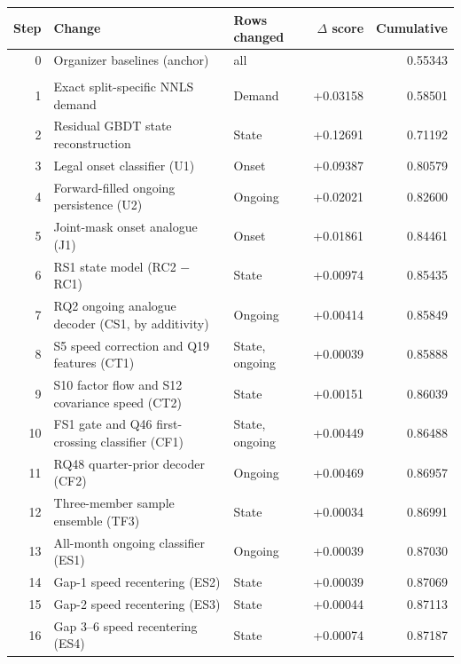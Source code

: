 \begin{tabular}{@{}r l l r r@{}}
\toprule
Step & Change & Rows changed & $\Delta$ score & Cumulative \\
\midrule
0 & Organizer baselines (anchor) & all & & 0.55343 \\\\
1 & Exact split-specific NNLS demand & Demand & +0.03158 & 0.58501 \\
2 & Residual GBDT state reconstruction & State & +0.12691 & 0.71192 \\
3 & Legal onset classifier (U1) & Onset & +0.09387 & 0.80579 \\
4 & Forward-filled ongoing persistence (U2) & Ongoing & +0.02021 & 0.82600 \\
5 & Joint-mask onset analogue (J1) & Onset & +0.01861 & 0.84461 \\
6 & RS1 state model (RC2 $-$ RC1) & State & +0.00974 & 0.85435 \\
7 & RQ2 ongoing analogue decoder (CS1, by additivity) & Ongoing & +0.00414 & 0.85849 \\
8 & S5 speed correction and Q19 features (CT1) & State, ongoing & +0.00039 & 0.85888 \\
9 & S10 factor flow and S12 covariance speed (CT2) & State & +0.00151 & 0.86039 \\
10 & FS1 gate and Q46 first-crossing classifier (CF1) & State, ongoing & +0.00449 & 0.86488 \\
11 & RQ48 quarter-prior decoder (CF2) & Ongoing & +0.00469 & 0.86957 \\
12 & Three-member sample ensemble (TF3) & State & +0.00034 & 0.86991 \\
13 & All-month ongoing classifier (ES1) & Ongoing & +0.00039 & 0.87030 \\
14 & Gap-1 speed recentering (ES2) & State & +0.00039 & 0.87069 \\
15 & Gap-2 speed recentering (ES3) & State & +0.00044 & 0.87113 \\
16 & Gap 3--6 speed recentering (ES4) & State & +0.00074 & 0.87187 \\
\bottomrule
\end{tabular}
